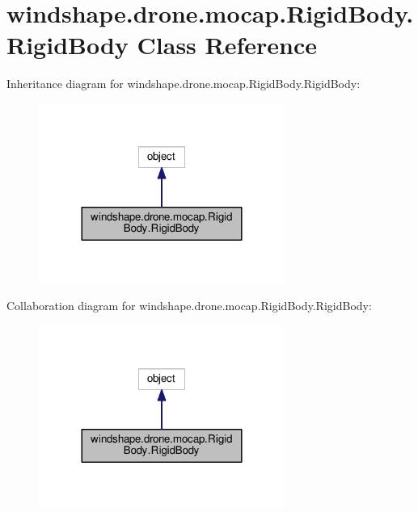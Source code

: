 \hypertarget{classwindshape_1_1drone_1_1mocap_1_1_rigid_body_1_1_rigid_body}{}\section{windshape.\+drone.\+mocap.\+Rigid\+Body.\+Rigid\+Body Class Reference}
\label{classwindshape_1_1drone_1_1mocap_1_1_rigid_body_1_1_rigid_body}


Inheritance diagram for windshape.\+drone.\+mocap.\+Rigid\+Body.\+Rigid\+Body\+:\nopagebreak
\begin{figure}[H]
\begin{center}
\leavevmode
\includegraphics[width=228pt]{classwindshape_1_1drone_1_1mocap_1_1_rigid_body_1_1_rigid_body__inherit__graph}
\end{center}
\end{figure}


Collaboration diagram for windshape.\+drone.\+mocap.\+Rigid\+Body.\+Rigid\+Body\+:\nopagebreak
\begin{figure}[H]
\begin{center}
\leavevmode
\includegraphics[width=228pt]{classwindshape_1_1drone_1_1mocap_1_1_rigid_body_1_1_rigid_body__coll__graph}
\end{center}
\end{figure}
